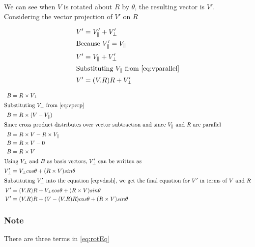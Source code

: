 \documentclass{article}
\begin{document}
    \noindent We can see when $V$ is rotated about $R$ by $\theta$, the resulting vector is $V'$. Considering the vector projection of $V'$ on $R$
    
    \begin{align}
        V' &= V'_{\parallel} + V'_{\perp} \\
        \intertext{Because $V'_{\parallel} = V_{\parallel}$}
        V' &= V_{\parallel} + V'_{\perp} \\
        \intertext{Substituting $V_{\parallel}$ from \ref{eq:vparallel}}
        V' &= (V.R) R + V'_{\perp} \label{eq:vdash}
    \end{align}

    
        \begin{align}
        B &= R \times V_{\perp} \\
        \intertext{Substituting $V_{\perp}$ from \ref{eq:vperp}}
        B &= R \times (V - V_{\parallel}) \\
        \intertext{Since cross product distributes over vector subtraction and since $V_{\parallel}$ and $R$ are parallel}
        B &= R \times V - R \times V_{\parallel} \\
        B &= R \times V - 0 \\
        B &= R \times V \label{eq:b} \\
        \intertext{Using $V_{\perp}$ and $B$ as basis vectors, $V'_{\perp}$ can be written as}
        V'_{\perp} &= V_{\perp} cos\theta + (R \times V) sin\theta \\
        \intertext{Substituting $V'_{\perp}$ into the equation \ref{eq:vdash}, we get the final equation for $V'$ in terms of $V$ and $R$}
        V' &= (V.R) R + V_{\perp} cos\theta + (R \times V) sin\theta \\ 
        V' &= (V.R) R + (V - (V.R) R) cos\theta + (R \times V) sin\theta \label{eq:rotEq}
    \end{align}
    
    \subsubsection*{Note}
    \noindent There are three terms in \ref{eq:rotEq} 
\end{document}
